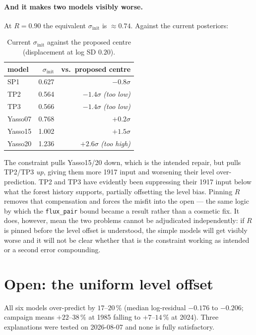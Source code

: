 \documentclass[11pt]{article}
\newcommand{\sinit}{\sigma_{\mathrm{init}}}
\begin{document}
\paragraph{And it makes two models visibly worse.} At $R = 0.90$ the equivalent $\sinit$ is
$\approx 0.74$. Against the current posteriors:

\begin{table}[H]\centering\small
\caption{Current $\sinit$ against the proposed centre (displacement at log SD $0.20$).}
\begin{tabular}{lrr}
\toprule
model & $\sinit$ & vs.\ proposed centre\\
\midrule
SP1     & 0.627 & $-0.8\sigma$\\
TP2     & 0.564 & $-1.4\sigma$ \emph{(too low)}\\
TP3     & 0.566 & $-1.4\sigma$ \emph{(too low)}\\
Yasso07 & 0.768 & $+0.2\sigma$\\
Yasso15 & 1.002 & $+1.5\sigma$\\
Yasso20 & 1.236 & $+2.6\sigma$ \emph{(too high)}\\
\bottomrule
\end{tabular}
\end{table}

\noindent The constraint pulls Yasso15/20 down, which is the intended repair, but pulls TP2/TP3
\emph{up}, giving them more 1917 input and worsening their level over-prediction. TP2 and TP3
have evidently been suppressing their 1917 input below what the forest history supports,
partially offsetting the level bias. Pinning $R$ removes that compensation and forces the
misfit into the open --- the same logic by which the \texttt{flux\_pair} bound became a result
rather than a cosmetic fix. It does, however, mean the two problems cannot be adjudicated
independently: if $R$ is pinned before the level offset is understood, the simple models will
get visibly worse and it will not be clear whether that is the constraint working as intended
or a second error compounding.

\section{Open: the uniform level offset}\label{sec:open}

All six models over-predict by $17$--$20\,\%$ (median log-residual $-0.176$ to $-0.206$;
campaign means $+22$--$38\,\%$ at 1985 falling to $+7$--$14\,\%$ at 2024). Three explanations
were tested on 2026-08-07 and none is fully satisfactory.
\end{document}
